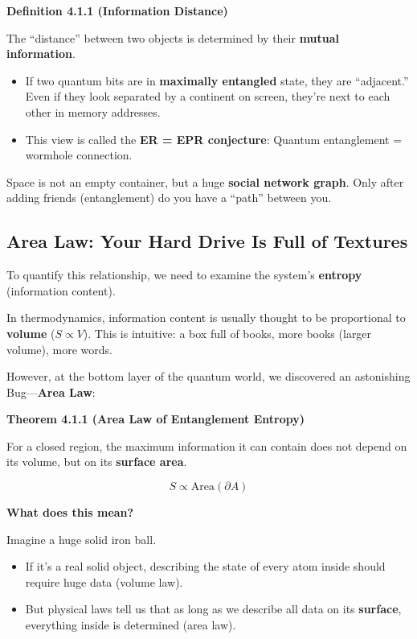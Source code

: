 \textbf{Definition 4.1.1 (Information Distance)}

The ``distance'' between two objects is determined by their \textbf{mutual information}.

\begin{itemize}
\item If two quantum bits are in \textbf{maximally entangled} state, they are ``adjacent.'' Even if they look separated by a continent on screen, they're next to each other in memory addresses.
\item This view is called the \textbf{ER = EPR conjecture}: Quantum entanglement = wormhole connection.
\end{itemize}

Space is not an empty container, but a huge \textbf{social network graph}. Only after adding friends (entanglement) do you have a ``path'' between you.

\subsection{Area Law: Your Hard Drive Is Full of Textures}

To quantify this relationship, we need to examine the system's \textbf{entropy} (information content).

In thermodynamics, information content is usually thought to be proportional to \textbf{volume} ($S \propto V$). This is intuitive: a box full of books, more books (larger volume), more words.

However, at the bottom layer of the quantum world, we discovered an astonishing Bug---\textbf{Area Law}:

\textbf{Theorem 4.1.1 (Area Law of Entanglement Entropy)}

For a closed region, the maximum information it can contain does not depend on its volume, but on its \textbf{surface area}.

\[
S \propto \text{Area}(\partial A)
\]

\textbf{What does this mean?}

Imagine a huge solid iron ball.
\begin{itemize}
\item If it's a real solid object, describing the state of every atom inside should require huge data (volume law).
\item But physical laws tell us that as long as we describe all data on its \textbf{surface}, everything inside is determined (area law).
\end{itemize}


